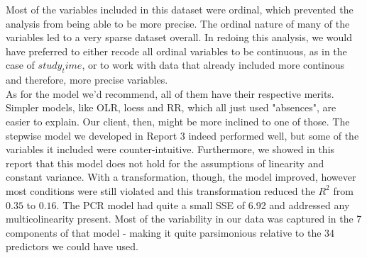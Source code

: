 \documentclass{article}
\begin{document}
\indent Most of the variables included in this dataset were ordinal, which prevented the analysis from being able to be more precise. The ordinal nature of many of the variables led to a very sparse dataset overall. In redoing this analysis, we would have preferred to either recode all ordinal variables to be continuous, as in the case of $study_time$, or to work with data that already included more continous and therefore, more precise variables.\\
\indent As for the model we'd recommend, all of them have their respective merits. Simpler models, like OLR, loess and RR, which all just used "absences", are easier to explain. Our client, then, might be more inclined to one of those. The stepwise model we developed in Report 3 indeed performed well, but some of the variables it included were counter-intuitive. Furthermore, we showed in this report that this model does not hold for the assumptions of linearity and constant variance. With a transformation, though, the model improved, however most conditions were still violated and this transformation reduced the $R^2$ from $0.35$ to $0.16$. The PCR model had quite a small SSE of 6.92 and addressed any multicolinearity present. Most of the variability in our data was captured in the 7 components of that model - making it quite parsimonious relative to the 34 predictors we could have used. 
\end{document}
